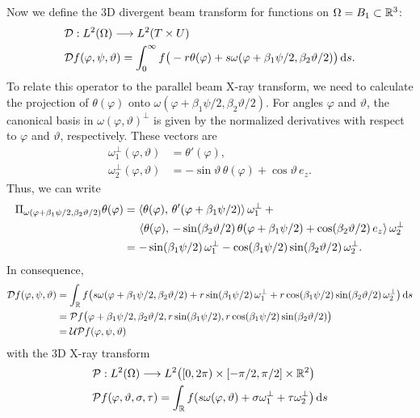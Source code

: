 \documentclass{amsart}
\renewcommand*{\phi}{\varphi}
\begin{document}
%
Now we define the 3D divergent beam transform for functions on $\Omega = B_1 \subset {\ensuremath{\mathbb{R}}}^3$:
%
\begin{align}
 &\OPD: L^2(\Omega) \Lto L^2(T \times U) \notag \\
 \label{eq:conecurved:fwdproj}
 &\OPD f(\phi, \psi, \vartheta) = \int_0^\infty f\big( -r\theta(\phi) + s\omega(\phi + \beta_1\psi/2, \beta_2\vartheta/2) \big)\, \D s.
\end{align}
%
To relate this operator to the parallel beam X-ray transform, we need to calculate the projection of $\theta(\phi)$ onto
$\omega(\phi + \beta_1\psi/2, \beta_2\vartheta/2)$. For angles $\phi$ and $\vartheta$, the canonical basis in 
$\omega(\phi, \vartheta)^\perp$ is given by the normalized derivatives with respect to $\phi$ and $\vartheta$, respectively. These vectors 
are
%
\begin{align}
 \label{eq:conecurved:omega1perp}
 \omega_1^\perp(\phi, \vartheta) &= \theta'(\phi), \\
 \label{eq:conecurved:omega2perp}
 \omega_2^\perp(\phi, \vartheta) &= -\sin\vartheta\, \theta(\phi) + \cos\vartheta\, e_z.
\end{align}
%
Thus, we can write
%
\begin{align*}
 \Pi_{\omega(\phi + \beta_1\psi/2, \beta_2\vartheta/2)} \theta(\phi)
 &= \INNER{\theta(\phi)}{\theta'(\phi + \beta_1\psi/2)}\, \omega_1^\perp + \phantom{x} \\
 &\hspace{14pt} \INNER{\theta(\phi)}{-\sin(\beta_2\vartheta/2)\, \theta(\phi + \beta_1\psi/2) + \cos(\beta_2\vartheta/2)\, e_z}\, 
 \omega_2^\perp \\
 &= -\sin(\beta_1\psi/2)\, \omega_1^\perp - \cos(\beta_1\psi/2) \sin(\beta_2\vartheta/2)\, \omega_2^\perp.
\end{align*}
%
In consequence,
%
\begin{align*}
 \OPD f(\phi, \psi, \vartheta)
 &= \int_\RR f\big( s\omega(\phi + \beta_1\psi/2, \beta_2\vartheta/2) + r\sin(\beta_1\psi/2)\, \omega_1^\perp + 
 r \cos(\beta_1\psi/2) \sin(\beta_2\vartheta/2)\, \omega_2^\perp \big)\, \D s \\
 &= \OPP f\big(\phi + \beta_1\psi/2, \beta_2\vartheta/2, r\sin(\beta_1\psi/2), r \cos(\beta_1\psi/2) \sin(\beta_2\vartheta/2) \big) \\
 &= \OPU \OPP f(\phi, \psi, \vartheta)
\end{align*}
%
with the 3D X-ray transform
%
\begin{align}
 &\OPP: L^2(\Omega) \Lto L^2\big( [0, 2\pi) \times [-\pi/2, \pi/2] \times \RR^2 \big) \notag \\
 \label{eq:conecurved:xray_proj}
 &\OPP f(\phi, \vartheta, \sigma, \tau) = \int_\RR f(s \omega(\phi, \vartheta) + \sigma \omega_1^\perp + \tau \omega_2^\perp \big)\, \D s
\end{align}
\end{document}
